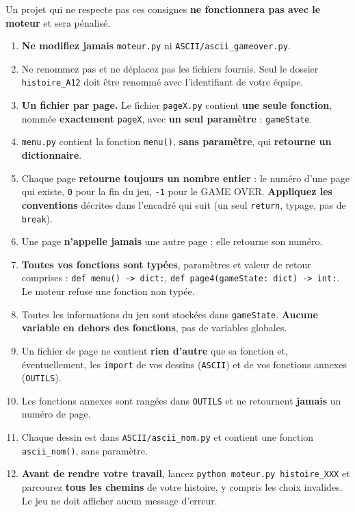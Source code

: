 \documentclass[11pt,a4paper]{article}
\newcommand{\fichier}[1]{\texttt{\color{nuit}#1}}
\begin{document}
\begin{consignes}
\large
Un projet qui ne respecte pas ces consignes \textbf{ne fonctionnera pas avec le moteur}
et sera pénalisé.
\normalsize\raggedright
\begin{enumerate}[leftmargin=1.6em, label=\textbf{\color{rouge}\arabic*.}, itemsep=0.5em]
  \item \textbf{Ne modifiez jamais} \fichier{moteur.py} ni \fichier{ASCII/ascii\_gameover.py}.
  \item Ne renommez pas et ne déplacez pas les fichiers fournis. Seul le dossier
        \fichier{histoire\_A12} doit être renommé avec l'identifiant de votre équipe.
  \item \textbf{Un fichier par page.} Le fichier \fichier{pageX.py} contient
        \textbf{une seule fonction}, nommée \textbf{exactement} \texttt{pageX}, avec
        \textbf{un seul paramètre} : \texttt{gameState}.
  \item \fichier{menu.py} contient la fonction \texttt{menu()}, \textbf{sans paramètre},
        qui \textbf{retourne un dictionnaire}.
  \item Chaque page \textbf{retourne toujours un nombre entier} : le numéro d'une page qui
        existe, \texttt{0} pour la fin du jeu, \texttt{-1} pour le GAME OVER.
        \textbf{Appliquez les conventions} décrites dans l'encadré qui suit
        (un seul \texttt{return}, typage, pas de \texttt{break}).
  \item Une page \textbf{n'appelle jamais} une autre page : elle retourne son numéro.
  \item \textbf{Toutes vos fonctions sont typées}, paramètres et valeur de retour
        comprises : \texttt{def menu() -> dict:},
        \texttt{def page4(gameState: dict) -> int:}. Le moteur refuse une fonction non
        typée.
  \item Toutes les informations du jeu sont stockées dans \texttt{gameState}.
        \textbf{Aucune variable en dehors des fonctions}, pas de variables globales.
  \item Un fichier de page ne contient \textbf{rien d'autre} que sa fonction et,
        éventuellement, les \texttt{import} de vos dessins (\fichier{ASCII}) et de vos
        fonctions annexes (\fichier{OUTILS}).
  \item Les fonctions annexes sont rangées dans \fichier{OUTILS} et ne retournent
        \textbf{jamais} un numéro de page.
  \item Chaque dessin est dans \fichier{ASCII/ascii\_nom.py} et contient une fonction
        \texttt{ascii\_nom()}, sans paramètre.
  \item \textbf{Avant de rendre votre travail}, lancez
        \texttt{python moteur.py histoire\_XXX} et parcourez \textbf{tous les chemins}
        de votre histoire, y compris les choix invalides. Le jeu ne doit afficher aucun
        message d'erreur.
\end{enumerate}
\end{consignes}
\end{document}
